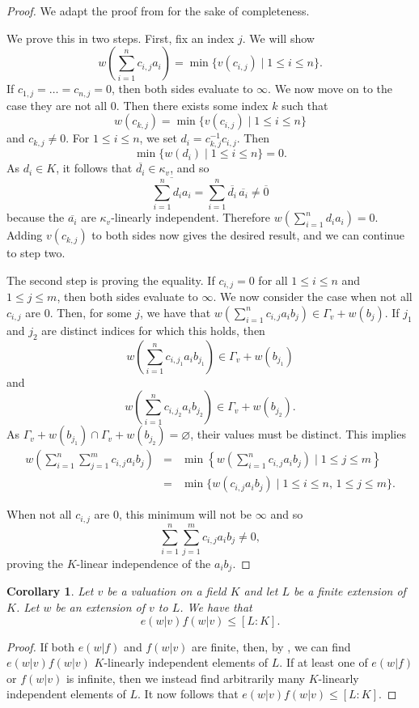\documentclass[12pt,a4paper]{amsart}
\newtheorem{cor}[thm]{Corollary}
\theoremstyle{definition}
\begin{document}
\begin{proof}
We adapt the proof from \cite[Lemma 3.2.2]{engler2005valued} for the sake of completeness.

We prove this in two steps.
First, fix an index $j$.
We will show
$$w\left(\sum_{i=1}^nc_{i,j}a_i\right)=\min\{v(c_{i,j})\mid1\leq i\leq n\}.$$
If $c_{1,j}=\ldots=c_{n,j}=0$, then both sides evaluate to $\infty$.
We now move on to the case they are not all $0$.
Then there exists some index $k$ such that
$$w\left(c_{k,j}\right)=\min\{v(c_{i,j})\mid1\leq i\leq n\}$$
and $c_{k,j}\neq0$.
For $1\leq i\leq n$, we set $d_i=c_{k,j}^{-1}c_{i,j}$.
Then $$\min\{w(d_i)\mid1\leq i\leq n\}=0.$$
As $d_i\in K$, it follows that $\overline{d_i}\in\kappa_v$, and so
$$\overline{\sum_{i=1}^nd_ia_i}=\sum_{i=1}^n\overline{d_i}\,\overline{a_i}\neq\overline{0}$$
because the $\overline{a_i}$ are $\kappa_v$-linearly independent.
Therefore $w\left(\sum_{i=1}^nd_ia_i\right)=0$.
Adding $v(c_{k,j})$ to both sides now gives the desired result, and we can continue to step two.

The second step is proving the equality.
If $c_{i,j}=0$ for all $1\leq i \leq n$ and $1\leq j\leq m$, then both sides evaluate to $\infty$.
We now consider the case when not all $c_{i,j}$ are $0$.
Then, for some $j$, we have that $w(\sum_{i=1}^nc_{i,j}a_ib_j)\in\Gamma_v+w(b_j)$.
If $j_1$ and $j_2$ are distinct indices for which this holds, then
$$w\left(\sum_{i=1}^nc_{i,{j_1}}a_ib_{j_1}\right)\in\Gamma_v+w(b_{j_1})$$
and
$$w\left(\sum_{i=1}^nc_{i,{j_2}}a_ib_{j_2}\right)\in\Gamma_v+w(b_{j_2}).$$
As $\Gamma_v+w(b_{j_1})\cap\Gamma_v+w(b_{j_2})=\varnothing$, their values must be distinct.
This implies
\begin{eqnarray*}
w\left(\sum_{i=1}^n\sum_{j=1}^mc_{i,j}a_ib_j\right)&=&\min\left\{w\left(\sum_{i=1}^nc_{i,j}a_ib_j\right)\mid 1\leq j\leq m\right\}\\
&=&\min\{w(c_{i,j}a_ib_j)\mid 1\leq i\leq n,\, 1\leq j\leq m\}.
\end{eqnarray*}

When not all $c_{i,j}$ are $0$, this minimum will not be $\infty$ and so $$\sum_{i=1}^n\sum_{j=1}^mc_{i,j}a_ib_j\neq0,$$
proving the $K$-linear independence of the $a_ib_j$.
\end{proof}
\begin{cor}
Let $v$ be a valuation on a field $K$ and let $L$ be a finite extension of $K$.
Let $w$ be an extension of $v$ to $L$. We have that
$$e(w|v)f(w|v)\leq [L:K].$$
\end{cor}
\begin{proof}
If both $e(w|f)$ and $f(w|v)$ are finite, then, by , we can find $e(w|v)f(w|v)$ $K$-linearly independent elements of $L$.
If at least one of $e(w|f)$ or $f(w|v)$ is infinite, then we instead find  arbitrarily many $K$-linearly independent elements of $L$.
It now follows that $e(w|v)f(w|v)\leq [L:K]$.
\end{proof}
\end{document}
